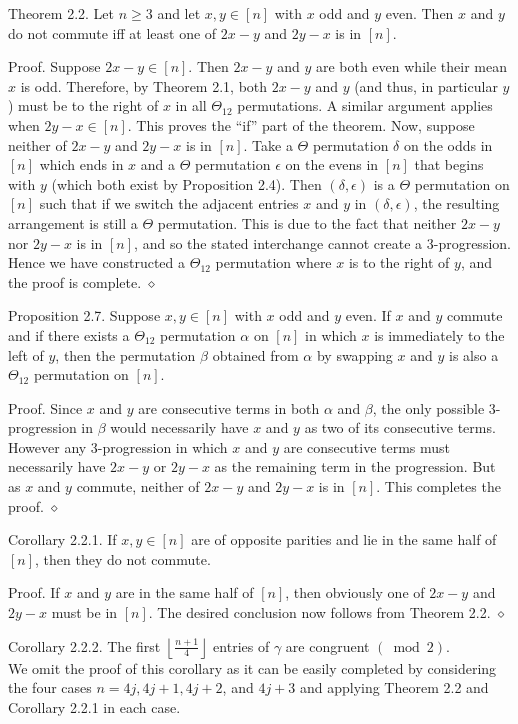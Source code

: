 \documentclass[10pt]{article}
\newcommand{\proofend}{\hfill\(\diamond\)}
\begin{document}
Theorem 2.2. Let $n\geq 3$ and let $x, y \in[n]$ with $x$ odd and $y$ even. Then $x$ and $y$ do not commute iff at least one of $2 x-y$ and $2 y-x$ is in $[n]$.

Proof. Suppose $2 x-y \in[n]$. Then $2 x-y$ and $y$ are both even while their mean $x$ is odd. Therefore, by Theorem 2.1, both $2 x-y$ and $y$ (and thus, in particular $y$ ) must be to the right of $x$ in all $\Theta_{12}$ permutations. A similar argument applies when $2 y-x \in[n]$. This proves the ``if'' part of the theorem. Now, suppose neither of $2 x-y$ and $2 y-x$ is in $[n]$. Take a $\Theta$ permutation $\delta$ on the odds in $[n]$ which ends in $x$ and a $\Theta$ permutation $\epsilon$ on the evens in $[n]$ that begins with $y$ (which both exist by Proposition 2.4). Then $(\delta, \epsilon)$ is a $\Theta$ permutation on $[n]$ such that if we switch the adjacent entries $x$ and $y$ in $(\delta, \epsilon)$, the resulting arrangement is still a $\Theta$ permutation. This is due to the fact that neither $2 x-y$ nor $2 y-x$ is in $[n]$, and so the stated interchange cannot create a 3-progression. Hence we have constructed a $\Theta_{12}$ permutation where $x$ is to the right of $y$, and the proof is complete. \proofend

Proposition 2.7. Suppose $x, y \in[n]$ with $x$ odd and $y$ even. If $x$ and $y$ commute and if there exists a $\Theta_{12}$ permutation $\alpha$ on $[n]$ in which $x$ is immediately to the left of $y$, then the permutation $\beta$ obtained from $\alpha$ by swapping $x$ and $y$ is also a $\Theta_{12}$ permutation on $[n]$.

Proof. Since $x$ and $y$ are consecutive terms in both $\alpha$ and $\beta$, the only possible 3-progression in $\beta$ would necessarily have $x$ and $y$ as two of its consecutive terms. However any 3-progression in which $x$ and $y$ are consecutive terms must necessarily have $2 x-y$ or $2 y-x$ as the remaining term in the progression. But as $x$ and $y$ commute, neither of $2 x-y$ and $2 y-x$ is in $[n]$. This completes the proof. \proofend

Corollary 2.2.1. If $x, y \in[n]$ are of opposite parities and lie in the same half of $[n]$, then they do not commute.

Proof. If $x$ and $y$ are in the same half of $[n]$, then obviously one of $2 x-y$ and $2 y-x$ must be in $[n]$. The desired conclusion now follows from Theorem 2.2. \proofend

Corollary 2.2.2. The first $\left\lfloor\frac{n+1}{4}\right\rfloor$ entries of $\gamma$ are congruent $(\bmod 2)$.\\
We omit the proof of this corollary as it can be easily completed by considering the four cases $n=4 j, 4 j+1,4 j+2$, and $4 j+3$ and applying Theorem 2.2 and Corollary 2.2.1 in each case.
\end{document}
